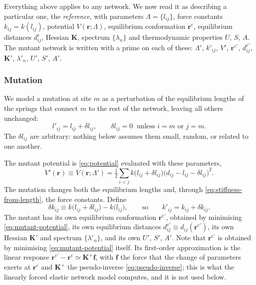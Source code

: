 \documentclass[11pt]{article}
\newcommand{\rr}{\mathbf{r}}
\newcommand{\KK}{\mathbf{K}}
\newcommand{\LL}{\Lambda}
\newcommand{\re}{\rr^{e}}
\newcommand{\rem}{\rr^{e\prime}}   %
\newcommand{\dije}{d^{e}_{ij}}
\newcommand{\dijem}{d^{e\prime}_{ij}}
\newcommand{\lijm}{l'_{ij}}
\newcommand{\kijm}{k'_{ij}}
\newcommand{\dlij}{\delta l_{ij}}
\newcommand{\dkij}{\delta k_{ij}}
\newcommand{\lij}{l_{ij}}
\newcommand{\kij}{k_{ij}}
\newcommand{\dij}{d_{ij}}
\begin{document}
Everything above applies to any network.
We now read it as describing a particular one, the \emph{reference}, with parameters $\LL = \{\lij\}$, force constants $\kij = k(\lij)$, potential $V(\rr;\LL)$, equilibrium conformation $\re$, equilibrium distances $\dije$, Hessian $\KK$, spectrum $\{\lambda_n\}$ and thermodynamic properties $U$, $S$, $A$.
The mutant network is written with a prime on each of these: $\LL'$, $\kijm$, $V'$, $\rem$, $\dijem$, $\KK'$, $\lambda'_n$, $U'$, $S'$, $A'$.

\subsubsection{Mutation}

We model a mutation at site $m$ as a perturbation of the equilibrium lengths of the springs that connect $m$ to the rest of the network, leaving all others unchanged:
\begin{equation}
\lijm = \lij + \dlij,
\qquad
\dlij = 0 \ \text{ unless } i = m \text{ or } j = m.
\label{eq:mutation-perturbation}
\end{equation}
The $\dlij$ are arbitrary: nothing below assumes them small, random, or related to one another.

The mutant potential is \eqref{eq:potential} evaluated with these parameters,
\begin{equation}
V'(\rr) \equiv V(\rr; \LL')
= \tfrac12 \sum_{i<j} k\big(\lij + \dlij\big)
\big(\dij - \lij - \dlij\big)^{2}.
\label{eq:mutant-potential}
\end{equation}
The mutation changes both the equilibrium lengths and, through \eqref{eq:stiffness-from-length}, the force constants.
Define
\begin{equation}
\dkij \equiv k\big(\lij + \dlij\big) - k\big(\lij\big),
\qquad\text{so}\qquad
\kijm = \kij + \dkij.
\label{eq:stiffness-change}
\end{equation}
The mutant has its own equilibrium conformation $\rem$, obtained by minimising \eqref{eq:mutant-potential}, its own equilibrium distances $\dijem \equiv \dij(\rem)$, its own Hessian $\KK'$ and spectrum $\{\lambda'_n\}$, and its own $U'$, $S'$, $A'$.
Note that $\rem$ is obtained by minimising \eqref{eq:mutant-potential} itself.
Its first-order approximation is the linear response $\rem - \re \simeq \KK^{+}\mathbf{f}$, with $\mathbf{f}$ the force that the change of parameters exerts at $\re$ and $\KK^{+}$ the pseudo-inverse \eqref{eq:pseudo-inverse}; this is what the linearly forced elastic network model computes, and it is not used below.
\end{document}
